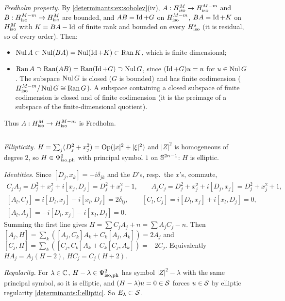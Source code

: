 \emph{Fredholm property.} By \cref{determinants:ex:sobolev}(iv), $A:H^{M}_{\mathrm{iso}}\to H^{M-m}_{\mathrm{iso}}$ and
$B:H^{M-m}_{\mathrm{iso}}\to H^{M}_{\mathrm{iso}}$ are bounded, and $AB=\operatorname{Id}+G$ on $H^{M-m}_{\mathrm{iso}}$, $BA=\operatorname{Id}+K$ on $H^{M}_{\mathrm{iso}}$ with
$K=BA-\operatorname{Id}$ of finite rank and bounded on every $H^{s}_{\mathrm{iso}}$ (it is residual, so of every order). Then:
\begin{itemize}
\item $\operatorname{Nul} A\subset\operatorname{Nul}(BA)=\operatorname{Nul}(\operatorname{Id}+K)\subset\operatorname{Ran} K$, which is finite dimensional;
\item $\operatorname{Ran} A\supset\operatorname{Ran}(AB)=\operatorname{Ran}(\operatorname{Id}+G)\supset\operatorname{Nul} G$, since $(\operatorname{Id}+G)u=u$ for $u\in\operatorname{Nul} G$. The
  subspace $\operatorname{Nul} G$ is closed ($G$ is bounded) and has finite codimension ($H^{M-m}_{\mathrm{iso}}/\operatorname{Nul} G\cong\operatorname{Ran} G$).
  A subspace containing a closed subspace of finite codimension is closed and of finite codimension
  (it is the preimage of a subspace of the finite-dimensional quotient).
\end{itemize}
Thus $A:H^{M}_{\mathrm{iso}}\to H^{M-m}_{\mathrm{iso}}$ is Fredholm.

\subsection*{}
\emph{Ellipticity.} $H=\sum_j(D_j^2+x_j^2)=\operatorname{Op}(|x|^2+|\xi|^2)$ and $|Z|^2$ is homogeneous of degree $2$,
so $H\in\Psi^{2}_{\mathrm{iso,ph}}$ with principal symbol $1$ on $\mathbb{S}^{2n-1}$: $H$ is elliptic.

\emph{Identities.} Since $[D_j,x_k]=-i\delta_{jk}$ and the $D$'s, resp.\ the $x$'s, commute,
\begin{gather*}
  C_jA_j=D_j^2+x_j^2+i[x_j,D_j]=D_j^2+x_j^2-1,\qquad A_jC_j=D_j^2+x_j^2+i[D_j,x_j]=D_j^2+x_j^2+1,\\
  [A_l,C_j]=i[D_l,x_j]-i[x_l,D_j]=2\delta_{lj},\qquad [C_l,C_j]=i[D_l,x_j]+i[x_l,D_j]=0,\\
  [A_l,A_j]=-i[D_l,x_j]-i[x_l,D_j]=0 .
\end{gather*}
Summing the first line gives $H=\sum C_jA_j+n=\sum A_jC_j-n$. Then
$[A_j,H]=\sum_k([A_j,C_k]A_k+C_k[A_j,A_k])=2A_j$ and
$[C_j,H]=\sum_k([C_j,C_k]A_k+C_k[C_j,A_k])=-2C_j$. Equivalently $HA_j=A_j(H-2)$, $HC_j=C_j(H+2)$.

\emph{Regularity.} For $\lambda\in\mathbb{C}$, $H-\lambda\in\Psi^{2}_{\mathrm{iso,ph}}$ has symbol $|Z|^2-\lambda$ with the same
principal symbol, so it is elliptic, and $(H-\lambda)u=0\in\mathcal{S}$ forces $u\in\mathcal{S}$ by elliptic regularity
\ref{determinants:I:elliptic}. So $E_\lambda\subset\mathcal{S}$.

